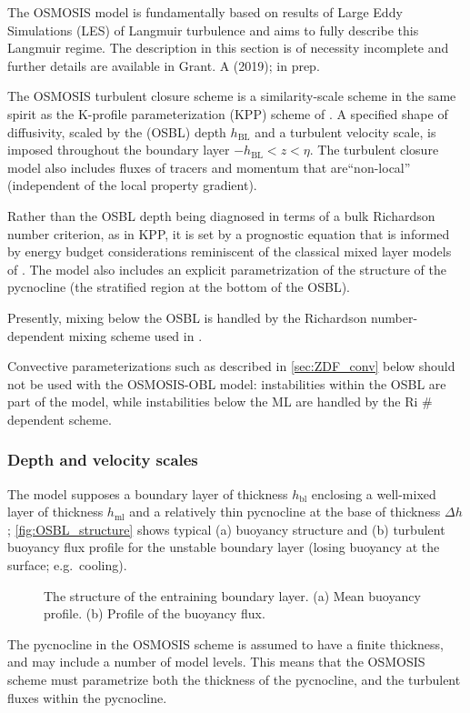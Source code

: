 \documentclass[../main/NEMO_manual]{subfiles}
\begin{document}
The OSMOSIS model is fundamentally based on results of Large Eddy
Simulations (LES) of Langmuir turbulence and aims to fully describe
this Langmuir regime. The description in this section is of necessity incomplete and further details are available in Grant. A (2019); in prep.

The OSMOSIS turbulent closure scheme is a similarity-scale scheme in
the same spirit as the K-profile
parameterization (KPP) scheme of \citet{large.mcwilliams.ea_RG94}.
A specified shape of diffusivity, scaled by the (OSBL) depth
$h_{\mathrm{BL}}$ and a turbulent velocity scale, is imposed throughout the
boundary layer
$-h_{\mathrm{BL}}<z<\eta$. The turbulent closure model
also includes fluxes of tracers and momentum that are``non-local'' (independent of the local property gradient).

Rather than the OSBL
depth being diagnosed in terms of a bulk Richardson number criterion,
as in KPP, it is set by a prognostic equation that is informed by
energy budget considerations reminiscent of the classical mixed layer
models of \citet{kraus.turner_T67}.
The model also includes an explicit parametrization of the structure
of the pycnocline (the stratified region at the bottom of the OSBL).

Presently, mixing below the OSBL is handled by the Richardson
number-dependent mixing scheme used in \citet{large.mcwilliams.ea_RG94}.

Convective parameterizations such as described in \autoref{sec:ZDF_conv}
below should not be used with the OSMOSIS-OBL model: instabilities
within the OSBL are part of the model, while instabilities below the
ML are handled by the Ri \# dependent scheme.

\subsubsection{Depth and velocity scales}
The model supposes a boundary layer of thickness $h_{\mathrm{bl}}$ enclosing a well-mixed layer of thickness $h_{\mathrm{ml}}$ and a relatively thin pycnocline at the base of thickness $\Delta h$; \autoref{fig:OSBL_structure} shows typical (a) buoyancy structure and (b) turbulent buoyancy flux profile for the unstable boundary layer (losing buoyancy at the surface; e.g.\ cooling).
\begin{figure}[!t]
  \begin{center}
    \caption{
      \protect\label{fig:OSBL_structure}
     The structure of the entraining  boundary layer. (a) Mean buoyancy profile. (b) Profile of the buoyancy flux.
    }
  \end{center}
\end{figure}
The pycnocline in the OSMOSIS scheme is assumed to have a finite thickness, and may include a number of model levels. This means that the OSMOSIS scheme must parametrize both the thickness of the pycnocline, and the turbulent fluxes within the pycnocline.
\end{document}
